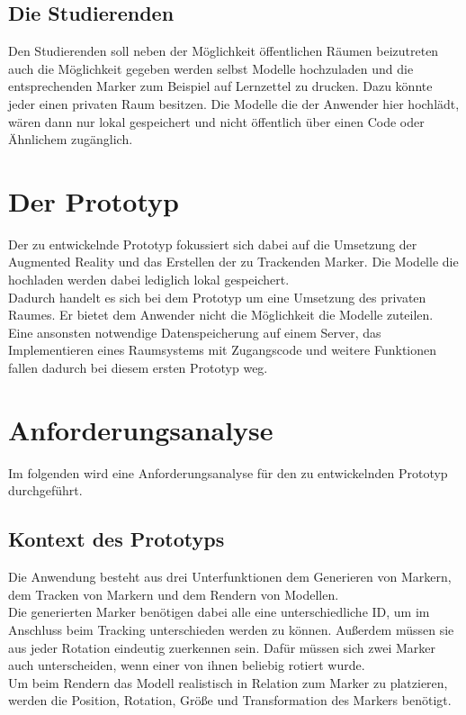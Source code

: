 \subsection{Die Studierenden}\label{sec:Anwendungsfall:Studierender}
Den Studierenden soll neben der Möglichkeit öffentlichen Räumen beizutreten auch die Möglichkeit gegeben werden selbst Modelle hochzuladen und die entsprechenden Marker zum Beispiel auf Lernzettel zu drucken. Dazu könnte jeder einen privaten Raum besitzen. Die Modelle die der Anwender hier hochlädt, wären dann nur lokal gespeichert und nicht öffentlich über einen Code oder Ähnlichem zugänglich. 

\section{Der Prototyp}
Der zu entwickelnde Prototyp fokussiert sich dabei auf die Umsetzung der Augmented Reality und das Erstellen der zu Trackenden Marker. Die Modelle die hochladen werden dabei lediglich lokal gespeichert. \\
Dadurch handelt es sich bei dem Prototyp um eine Umsetzung des \glqq privaten Raumes\grqq . Er bietet dem Anwender nicht die Möglichkeit die Modelle zuteilen.\\ 
Eine ansonsten notwendige Datenspeicherung auf einem Server, das Implementieren eines Raumsystems mit Zugangscode und weitere Funktionen fallen dadurch bei diesem ersten Prototyp weg.


\section{Anforderungsanalyse}\label{sec:Anforderungsanalyse}
Im folgenden wird eine Anforderungsanalyse für den zu entwickelnden Prototyp durchgeführt.

\subsection{Kontext des Prototyps}
Die Anwendung besteht aus drei Unterfunktionen dem Generieren von Markern, dem Tracken von Markern und dem Rendern von Modellen.\\
Die generierten Marker benötigen dabei alle eine unterschiedliche ID, um im Anschluss beim Tracking unterschieden werden zu können. Außerdem müssen sie aus jeder Rotation eindeutig zuerkennen sein. Dafür müssen sich zwei Marker auch unterscheiden, wenn einer von ihnen beliebig rotiert wurde.\\
Um beim Rendern das Modell realistisch in Relation zum Marker zu platzieren, werden die Position, Rotation, Größe und Transformation des Markers benötigt. 


